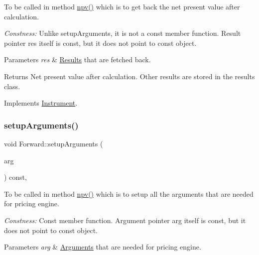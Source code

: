 To be called in method \hyperlink{class_instrument_aa750f2ae95a21d65a073da3171e8d084}{npv()} which is to get back the net present value after calculation. 

{\itshape Constness\+:} Unlike setup\+Arguments, it is not a const member function. Result pointer res itself is const, but it does not point to const object. 
\begin{DoxyParams}{Parameters}
{\em res} & \hyperlink{class_forward_1_1_results}{Results} that are fetched back. \\
\hline
\end{DoxyParams}
\begin{DoxyReturn}{Returns}
Net present value after calculation. Other results are stored in the results class. 
\end{DoxyReturn}


Implements \hyperlink{class_instrument_a381f093402f789ad7c0ffecd233167dc}{Instrument}.

\hypertarget{class_forward_a909ab0cefa0ab42bdaf3bf6e84ac0096}{}\label{class_forward_a909ab0cefa0ab42bdaf3bf6e84ac0096} 
\subsubsection{\texorpdfstring{setup\+Arguments()}{setupArguments()}}
{\footnotesize\ttfamily void Forward\+::setup\+Arguments (\begin{DoxyParamCaption}\item[{\hyperlink{class_pricing_engine_1_1_arguments}{Pricing\+Engine\+::\+Arguments} $\ast$const}]{arg }\end{DoxyParamCaption}) const\hspace{0.3cm}{\ttfamily [override]}, {\ttfamily [virtual]}}



To be called in method \hyperlink{class_instrument_aa750f2ae95a21d65a073da3171e8d084}{npv()} which is to setup all the arguments that are needed for pricing engine. 

{\itshape Constness\+:} Const member function. Argument pointer arg itself is const, but it does not point to const object. 
\begin{DoxyParams}{Parameters}
{\em arg} & \hyperlink{class_forward_1_1_arguments}{Arguments} that are needed for pricing engine. \\
\hline
\end{DoxyParams}


